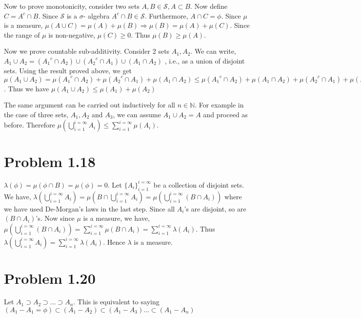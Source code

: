 \documentclass[letterpaper,12pt]{article}
\theoremstyle{definition}
\begin{document}
 Now to prove monotonicity, consider two sets $A, B \in \mathcal{S}, A \subset B$. Now define $C = A^c \cap B$. Since $\mathcal{S}$ is a $\sigma$- algebra    $A^c \cap B \in \mathcal{S}$. Furthermore, $A \cap C = \phi$. Since $\mu$ is a measure, $\mu(A \cup C) = \mu(A) + \mu(B) \Rightarrow  \mu(B) = \mu(A) + \mu(C)$. Since the range of $\mu$ is non-negative, $\mu(C) \ge 0$. Thus $\mu(B) \ge \mu(A)$.

 Now we prove countable sub-additivity. Consider 2 sets $A_1, A_2$. We can write, $A_1 \cup A_2 = ({A_1}^c \cap A_2) \cup ({A_2}^c \cap A_1) \cup (A_1 \cap A_2)$   , i.e., as a union of disjoint sets. Using the result proved above, we get $\mu(A_1 \cup A_2) = \mu({A_1}^c \cap A_2) + \mu({A_2}^c \cap A_1) + \mu(A_1 \cap A_2)
    \le \mu({A_1}^c \cap A_2) + \mu(A_1 \cap A_2) + \mu({A_2}^c \cap A_1) + \mu(A_1 \cap A_2) = \mu(A_1) + \mu(A_2)$. Thus we have $\mu (A_1 \cup A_2) \le \mu(A_1) + \mu(A_2)$
    

The same argument can be carried out inductively for all $n \in \mathbb{N}$. For example in the case of three sets, $A_1, A_2$ and $A_3$, we can assume $A_1 \cup A_2 = A$ and proceed as before. Therefore $\mu(\bigcup_{i=1}^{i=\infty}A_i) \le \sum_{i=1}^{i=\infty}\mu(A_i)$.

  \section*{Problem 1.18}

    $\lambda(\phi) = \mu(\phi \cap B) = \mu(\phi) = 0$. Let $\{A_i\}_{i=1}^{i= \infty}$ be a collection of disjoint sets.
    We have, $\lambda(\bigcup_{i=1}^{i = \infty}A_i) = \mu(B \cap \bigcup_{i=1}^{i = \infty}A_i) = \mu(\bigcup_{i=1}^{i=\infty}(B \cap A_i))$ where we have used De-Morgan's laws in the last step.
    Since all $A_i$'s are disjoint, so are $(B\cap A_i)$'s. Now since $\mu$ is a measure, we have, $\mu(\bigcup_{i=1}^{i=\infty}(B \cap A_i))  = \sum_{i=1}^{i=\infty}\mu(B \cap A_i) = \sum_{i=1}^{i=\infty} \lambda(A_i)$. Thus $\lambda(\bigcup_{i=1}^{i = \infty}A_i) =  \sum_{i=1}^{i=\infty} \lambda(A_i)$. Hence $\lambda$ is a measure.

  \section*{Problem 1.20}

    Let $A_1 \supset A_2 \supset ... \supset A_n$. This is equivalent to saying $(A_1 - A_1= \phi) \subset (A_1 - A_2) \subset (A_1 - A_3)... \subset(A_1 - A_n)$
\end{document}
